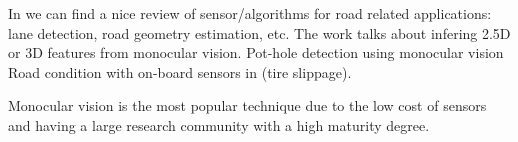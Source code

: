 In \cite{Lundquist2011} we can find a nice review of sensor/algorithms for road 
related applications: lane detection, road geometry estimation, etc.
The work \cite{Yebes2015} talks about infering 2.5D or 3D features from monocular 
vision.
Pot-hole detection using monocular vision
Road condition with on-board sensors in \cite{CastilloAguilar2015} (tire slippage).

Monocular vision is the most popular technique due to the low cost of sensors and 
having a large research community with a high maturity degree.

%    


